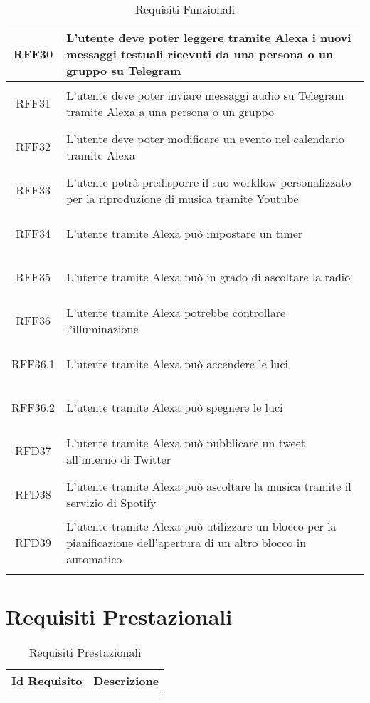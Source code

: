 \begin{longtable}{|c|X|}
	\hypertarget{RFF30}{RFF30} &  L'utente deve poter leggere tramite Alexa i nuovi messaggi testuali ricevuti da una persona o un gruppo su Telegram \\ \hline
	
	\hypertarget{RFF31}{RFF31} & L'utente deve poter inviare messaggi audio su Telegram tramite Alexa a una persona o un gruppo \\ \hline
	
	\hypertarget{RFF32}{RFF32} & L'utente deve poter modificare un evento nel calendario tramite Alexa \\ \hline
	
	\hypertarget{RFF33}{RFF33} & L'utente potrà predisporre il suo workflow personalizzato per la riproduzione di musica tramite Youtube \\ \hline
	
	\hypertarget{RFF34}{RFF34} & L'utente tramite Alexa può impostare un timer \\ \hline
	
	\hypertarget{RFF35}{RFF35} & L'utente tramite Alexa può in grado di ascoltare la radio \\ \hline
	
	\hypertarget{RFF36}{RFF36} & L'utente tramite Alexa potrebbe controllare l'illuminazione \\ \hline
	
	\hypertarget{RFF36.1}{RFF36.1} & L'utente tramite Alexa può accendere le luci \\ \hline
	
	\hypertarget{RFF36.2}{RFF36.2} & L'utente tramite Alexa può spegnere le luci \\ \hline
	
	\hypertarget{RFD37}{RFD37} & L'utente tramite Alexa può pubblicare un tweet all'interno di Twitter \\ \hline
	
	\hypertarget{RFD38}{RFD38} & L'utente tramite Alexa può ascoltare la musica tramite il servizio di Spotify \\ \hline
	
	\hypertarget{RFD39}{RFD39} & L'utente tramite Alexa può utilizzare un blocco per la pianificazione dell'apertura di un altro blocco in automatico \\ \hline
	
	\caption[Requisiti Funzionali]{Requisiti Funzionali}
	\label{tabella:req0}
\end{longtable}
\clearpage
\section{Requisiti Prestazionali}
\normalsize
\begin{longtable}{|c|X|}
	\hline
	\textbf{Id Requisito} & \textbf{Descrizione} \\
	\hline
	\endhead
	
	\caption[Requisiti Prestazionali]{Requisiti Prestazionali}
	\label{tabella:req1}
\end{longtable}
\clearpage
